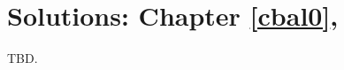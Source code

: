 \chapter[Solutions: Chapter \ref{cbal0}]
        {Solutions: Chapter \ref{cbal0}, \cbalzerolongtitle{}}

\label{cbas0}

TBD.


